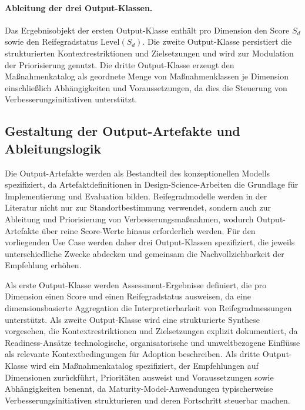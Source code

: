 \paragraph{Ableitung der drei Output-Klassen.}
Das Ergebnisobjekt der ersten Output-Klasse enthält pro Dimension den Score $S_d$ sowie den Reifegradstatus $\text{Level}(S_d)$.\cite{deBruin2005MainPhases,BeckerKnackstedtPoeppelbuss2009ProcedureModel}
Die zweite Output-Klasse persistiert die strukturierten Kontextrestriktionen und Zielsetzungen und wird zur Modulation der Priorisierung genutzt.\cite{TornatzkyFleischer1990TOE,OliveiraMartins2011ITAdoptionReview}
Die dritte Output-Klasse erzeugt den Maßnahmenkatalog als geordnete Menge von Maßnahmenklassen je Dimension einschließlich Abhängigkeiten und Voraussetzungen, da dies die Steuerung von Verbesserungsinitiativen unterstützt.\cite{PoeppeelbussRoeglinger2011DesignPrinciples,RoeglingerPoeppelbuss2011BPMMaturityModels}




\subsection{Gestaltung der Output-Artefakte und Ableitungslogik}
\label{subsec:kap3_output_artefakte}

Die Output-Artefakte werden als Bestandteil des konzeptionellen Modells spezifiziert, da Artefaktdefinitionen in Design-Science-Arbeiten die Grundlage für Implementierung und Evaluation bilden.\cite{Hevner2004DesignScience,MarchSmith1995DesignNaturalScience,Nunamaker1990SystemsDevelopment}
Reifegradmodelle werden in der Literatur nicht nur zur Standortbestimmung verwendet, sondern auch zur Ableitung und Priorisierung von Verbesserungsmaßnahmen, wodurch Output-Artefakte über reine Score-Werte hinaus erforderlich werden.\cite{PoeppeelbussRoeglinger2011DesignPrinciples,RoeglingerPoeppelbuss2011BPMMaturityModels}
Für den vorliegenden Use Case werden daher drei Output-Klassen spezifiziert, die jeweils unterschiedliche Zwecke abdecken und gemeinsam die Nachvollziehbarkeit der Empfehlung erhöhen.\cite{Hevner2004DesignScience,PoeppeelbussRoeglinger2011DesignPrinciples}

Als erste Output-Klasse werden Assessment-Ergebnisse definiert, die pro Dimension einen Score und einen Reifegradstatus ausweisen, da eine dimensionsbasierte Aggregation die Interpretierbarkeit von Reifegradmessungen unterstützt.\cite{deBruin2005MainPhases,BeckerKnackstedtPoeppelbuss2009ProcedureModel}
Als zweite Output-Klasse wird eine strukturierte Synthese vorgesehen, die Kontextrestriktionen und Zielsetzungen explizit dokumentiert, da Readiness-Ansätze technologische, organisatorische und umweltbezogene Einflüsse als relevante Kontextbedingungen für Adoption beschreiben.\cite{TornatzkyFleischer1990TOE,OliveiraMartins2011ITAdoptionReview}
Als dritte Output-Klasse wird ein Maßnahmenkatalog spezifiziert, der Empfehlungen auf Dimensionen zurückführt, Prioritäten ausweist und Voraussetzungen sowie Abhängigkeiten benennt, da Maturity-Model-Anwendungen typischerweise Verbesserungsinitiativen strukturieren und deren Fortschritt steuerbar machen.\cite{PoeppeelbussRoeglinger2011DesignPrinciples,RoeglingerPoeppelbuss2011BPMMaturityModels}

